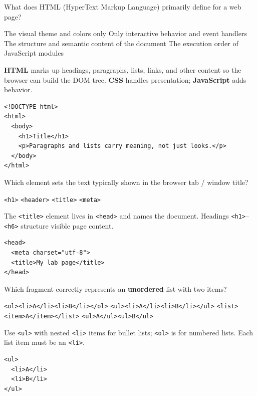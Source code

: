 



\question[4]
What does HTML (HyperText Markup Language) primarily define for a web page?
\begin{choices}
  \choice The visual theme and colors only
  \choice Only interactive behavior and event handlers
  \CorrectChoice The structure and semantic content of the document
  \choice The execution order of JavaScript modules
\end{choices}
\begin{solution}
  \textbf{HTML} marks up headings, paragraphs, lists, links, and other content so the browser can build the DOM tree. \textbf{CSS} handles presentation; \textbf{JavaScript} adds behavior.
\begin{lstlisting}[style=htmlexam]
<!DOCTYPE html>
<html>
  <body>
    <h1>Title</h1>
    <p>Paragraphs and lists carry meaning, not just looks.</p>
  </body>
</html>
\end{lstlisting}
\end{solution}

\question[4]
Which element sets the text typically shown in the browser tab / window title?
\begin{choices}
  \choice \texttt{<h1>}
  \choice \texttt{<header>}
  \CorrectChoice \texttt{<title>}
  \choice \texttt{<meta>}
\end{choices}
\begin{solution}
  The \texttt{<title>} element lives in \texttt{<head>} and names the document. Headings \texttt{<h1>}--\texttt{<h6>} structure visible page content.
\begin{lstlisting}[style=htmlexam]
<head>
  <meta charset="utf-8">
  <title>My lab page</title>
</head>
\end{lstlisting}
\end{solution}

\question[4]
Which fragment correctly represents an \textbf{unordered} list with two items?
\begin{choices}
  \choice \texttt{<ol><li>A</li><li>B</li></ol>}
  \CorrectChoice \texttt{<ul><li>A</li><li>B</li></ul>}
  \choice \texttt{<list><item>A</item></list>}
  \choice \texttt{<ul>A</ul><ul>B</ul>}
\end{choices}
\begin{solution}
  Use \texttt{<ul>} with nested \texttt{<li>} items for bullet lists; \texttt{<ol>} is for numbered lists. Each list item must be an \texttt{<li>}.
\begin{lstlisting}[style=htmlexam]
<ul>
  <li>A</li>
  <li>B</li>
</ul>
\end{lstlisting}
\end{solution}

